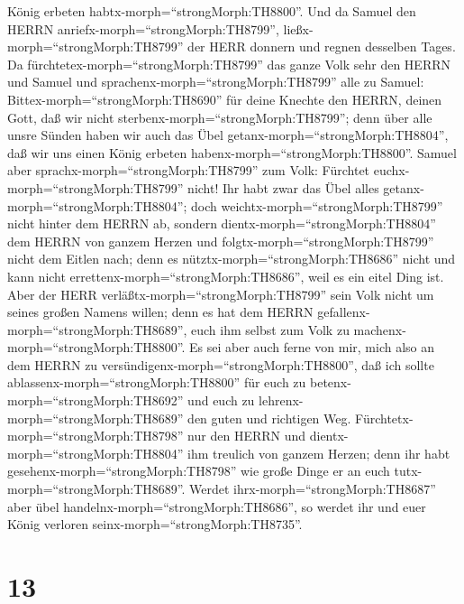 König erbeten habtx-morph=``strongMorph:TH8800''.  Und da
Samuel den HERRN anriefx-morph=``strongMorph:TH8799'',
ließx-morph=``strongMorph:TH8799'' der HERR donnern und regnen desselben
Tages. Da fürchtetex-morph=``strongMorph:TH8799'' das ganze Volk sehr
den HERRN und Samuel  und
sprachenx-morph=``strongMorph:TH8799'' alle zu Samuel:
Bittex-morph=``strongMorph:TH8690'' für deine Knechte den HERRN, deinen
Gott, daß wir nicht sterbenx-morph=``strongMorph:TH8799''; denn über
alle unsre Sünden haben wir auch das Übel
getanx-morph=``strongMorph:TH8804'', daß wir uns einen König erbeten
habenx-morph=``strongMorph:TH8800''.  Samuel aber
sprachx-morph=``strongMorph:TH8799'' zum Volk: Fürchtet
euchx-morph=``strongMorph:TH8799'' nicht! Ihr habt zwar das Übel alles
getanx-morph=``strongMorph:TH8804''; doch
weichtx-morph=``strongMorph:TH8799'' nicht hinter dem HERRN ab, sondern
dientx-morph=``strongMorph:TH8804'' dem HERRN von ganzem Herzen
 und folgtx-morph=``strongMorph:TH8799'' nicht dem Eitlen
nach; denn es nütztx-morph=``strongMorph:TH8686'' nicht und kann nicht
errettenx-morph=``strongMorph:TH8686'', weil es ein eitel Ding ist.
 Aber der HERR verläßtx-morph=``strongMorph:TH8799'' sein
Volk nicht um seines großen Namens willen; denn es hat dem HERRN
gefallenx-morph=``strongMorph:TH8689'', euch ihm selbst zum Volk zu
machenx-morph=``strongMorph:TH8800''.  Es sei aber auch
ferne von mir, mich also an dem HERRN zu
versündigenx-morph=``strongMorph:TH8800'', daß ich sollte
ablassenx-morph=``strongMorph:TH8800'' für euch zu
betenx-morph=``strongMorph:TH8692'' und euch zu
lehrenx-morph=``strongMorph:TH8689'' den guten und richtigen Weg.
 Fürchtetx-morph=``strongMorph:TH8798'' nur den HERRN und
dientx-morph=``strongMorph:TH8804'' ihm treulich von ganzem Herzen; denn
ihr habt gesehenx-morph=``strongMorph:TH8798'' wie große Dinge er an
euch tutx-morph=``strongMorph:TH8689''.  Werdet
ihrx-morph=``strongMorph:TH8687'' aber übel
handelnx-morph=``strongMorph:TH8686'', so werdet ihr und euer König
verloren seinx-morph=``strongMorph:TH8735''.

\hypertarget{section-12}{%
\section{13}\label{section-12}}

